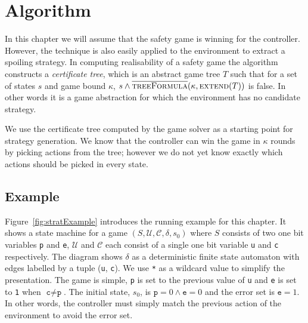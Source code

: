 \section{Algorithm}

In this chapter we will assume that the safety game is winning for the controller. However, the technique is also easily applied to the environment to extract a spoiling strategy. In computing realisability of a safety game the algorithm constructs a \emph{certificate tree}, which is an abstract game tree $T$ such that for a set of states $s$ and game bound $\kappa$, $s \land \textsc{$\overline{\mbox{treeFormula}}$}(\kappa, \textsc{extend}(T))$ is false. In other words it is a game abstraction for which the environment has no candidate strategy.

We use the certificate tree computed by the game solver as a starting point for strategy generation.  We know that the controller can win the game in $\kappa$ rounds by picking actions from the tree; however we do not yet know exactly which actions should be picked in every state.


\subsection{Example}

Figure~\ref{fig:stratExample} introduces the running example for this chapter. It shows a state machine for a game $(S, \mathcal{U}, \mathcal{C}, \delta, s_0)$ where $S$ consists of two one bit variables \texttt{p} and \texttt{e}, $\mathcal{U}$ and $\mathcal{C}$ each consist of a single one bit variable \texttt{u} and \texttt{c} respectively. The diagram shows $\delta$ as a deterministic finite state automaton with edges labelled by a tuple (\texttt{u}, \texttt{c}). We use \texttt{*} as a wildcard value to simplify the presentation. The game is simple, \texttt{p} is set to the previous value of \texttt{u} and \texttt{e} is set to \texttt{1} when $\texttt{c} \neq \texttt{p}$. The initial state, $s_0$, is $\texttt{p} = 0 \land \texttt{e} = 0$ and the error set is $\texttt{e} = 1$. In other words, the controller must simply match the previous action of the environment to avoid the error set.


